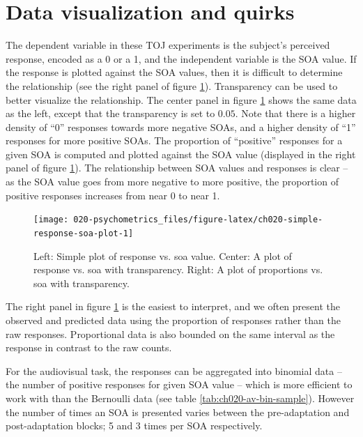 \documentclass[11pt, oneside, openany]{scrbook}
\begin{document}
\hypertarget{data-visualization-and-quirks}{%
\section{Data visualization and quirks}\label{data-visualization-and-quirks}}

The dependent variable in these TOJ experiments is the subject's perceived response, encoded as a 0 or a 1, and the independent variable is the SOA value. If the response is plotted against the SOA values, then it is difficult to determine the relationship (see the right panel of figure \ref{fig:ch020-simple-response-soa-plot}). Transparency can be used to better visualize the relationship. The center panel in figure \ref{fig:ch020-simple-response-soa-plot} shows the same data as the left, except that the transparency is set to \(0.05\). Note that there is a higher density of ``0'' responses towards more negative SOAs, and a higher density of ``1'' responses for more positive SOAs. The proportion of ``positive'' responses for a given SOA is computed and plotted against the SOA value (displayed in the right panel of figure \ref{fig:ch020-simple-response-soa-plot}). The relationship between SOA values and responses is clear -- as the SOA value goes from more negative to more positive, the proportion of positive responses increases from near 0 to near 1.

\begin{figure}

{\centering \texttt{[image: 020-psychometrics\_files/figure-latex/ch020-simple-response-soa-plot-1]} 

}

\caption{Left: Simple plot of response vs. soa value. Center: A plot of response vs. soa with transparency. Right: A plot of proportions vs. soa with transparency.}\label{fig:ch020-simple-response-soa-plot}
\end{figure}

The right panel in figure \ref{fig:ch020-simple-response-soa-plot} is the easiest to interpret, and we often present the observed and predicted data using the proportion of responses rather than the raw responses. Proportional data is also bounded on the same interval as the response in contrast to the raw counts.

For the audiovisual task, the responses can be aggregated into binomial data -- the number of positive responses for given SOA value -- which is more efficient to work with than the Bernoulli data (see table \ref{tab:ch020-av-bin-sample}). However the number of times an SOA is presented varies between the pre-adaptation and post-adaptation blocks; 5 and 3 times per SOA respectively.
\end{document}
